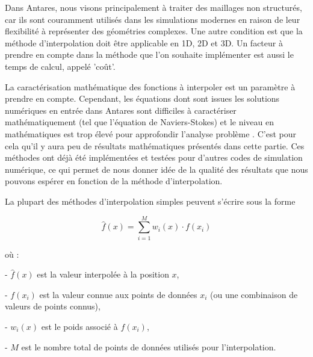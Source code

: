 
Dans Antares, nous visons principalement à traiter des maillages non structurés, car ils sont couramment utilisés dans les simulations modernes en raison de leur flexibilité à représenter des géométries complexes. Une autre condition est que la méthode d'interpolation doit être applicable en 1D, 2D et 3D. Un facteur à prendre en compte dans la méthode que l'on souhaite implémenter est aussi le temps de calcul, appelé 'coût'.

La caractérisation mathématique des fonctions à interpoler est un paramètre à prendre en compte. Cependant, les équations dont sont issues les solutions numériques en entrée dans Antares sont difficiles à caractériser mathématiquement (tel que l'équation de Naviers-Stokes) et le niveau en mathématiques est trop élevé pour approfondir l'analyse problème \cite{gordont1971_2}. C'est pour cela qu'il y aura peu de résultats mathématiques présentés dans cette partie.
Ces méthodes ont déjà été implémentées et testées pour d'autres codes de simulation numérique, ce qui permet de nous donner idée de la qualité des résultats que nous pouvons espérer en fonction de la méthode d'interpolation.


La plupart des méthodes d'interpolation simples peuvent s'écrire sous la forme

\begin{equation}
    \hat{f}(x) = \sum_{i=1}^{M} w_i(x) \cdot f(x_i)
\end{equation}

où :

- \(\hat{f}(x)\) est la valeur interpolée à la position \(x\),

\vspace{-0,2cm}

- \(f(x_i)\) est la valeur connue aux points de données \(x_i\) (ou une combinaison de valeurs de points connus),

\vspace{-0,2cm}

- \(w_i(x)\) est le poids associé à \(f(x_i)\),

\vspace{-0,2cm}

- \(M\) est le nombre total de points de données utilisés pour l'interpolation.

